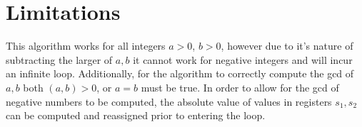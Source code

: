 \documentclass{article}
\begin{document}
\section{Limitations}
This algorithm works for all integers $a > 0$, $b > 0$, however due to it's nature of subtracting the larger of $a, b$ it cannot work for negative integers and will incur an infinite loop. Additionally, for the algorithm to correctly compute the gcd of $a, b$ both $(a, b) > 0$, or $a=b$ must be true. In order to allow for the gcd of negative numbers to be computed, the absolute value of values in registers $s_1, s_2$ can be computed and reassigned prior to entering the loop.
\end{document}
